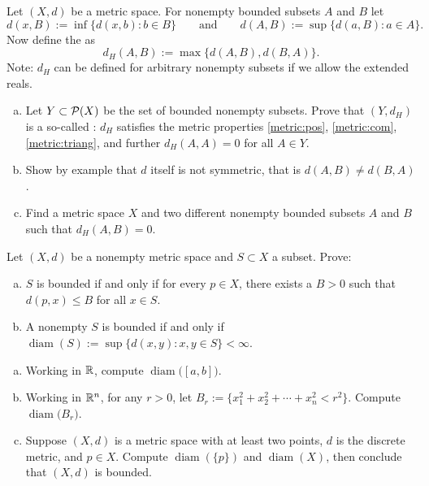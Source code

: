 \begin{exercise} \label{exercise:mshausdorffpseudo}
Let $(X,d)$ be a metric space.  For nonempty bounded subsets $A$ and $B$ let
\begin{equation*}
d(x,B) := \inf \bigl\{ d(x,b) : b \in B \bigl\}
\qquad \text{and} \qquad
d(A,B) := \sup \bigl\{ d(a,B) : a \in A \bigr\} .
\end{equation*}
Now define the \emph{} as
\begin{equation*}
d_H(A,B) := \max \bigl\{ d(A,B) , d(B,A) \bigr\} .
\end{equation*}
Note: $d_H$ can be defined for arbitrary nonempty subsets if we allow the
extended reals.
\begin{enumerate}[a)]
\item
Let $Y \subset {\mathcal{P}}(X)$ be the set of bounded nonempty subsets.
Prove that
$(Y,d_H)$ is a so-called \emph{}:
$d_H$ satisfies the metric properties
\ref{metric:pos},
\ref{metric:com}, 
\ref{metric:triang}, and further
$d_H(A,A) = 0$ for all $A \in Y$. 
\item
Show by example that $d$ itself is not symmetric, that is $d(A,B) \not=
d(B,A)$.
\item
Find a metric space $X$ and two different
nonempty bounded subsets $A$ and $B$ such that $d_H(A,B) = 0$.
\end{enumerate}
\end{exercise}

\begin{exercise}
Let $(X,d)$ be a nonempty metric space and $S \subset X$ a subset.  Prove:
\begin{enumerate}[a)]
\item
$S$ is bounded if and only if
for every $p \in X$, there exists a $B > 0$ such that $d(p,x) \leq B$ for
all $x \in S$.
\item
A nonempty $S$ is bounded if and only if
$\operatorname{diam}(S) := \sup \{ d(x,y) : x,y \in S \} < \infty$.
\end{enumerate}
\end{exercise}

\begin{samepage}
\begin{exercise}
\leavevmode
\begin{enumerate}[a)]
\item
Working in ${\mathbb{R}}$, compute $\operatorname{diam}\bigl([a,b]\bigr)$.
\item
Working in ${\mathbb{R}}^n$, for any $r > 0$, let $B_r := \{ x_1^2+x_2^2+\cdots+x_n^2
< r^2 \}$.  Compute $\operatorname{diam}\bigl(B_r\bigr)$.
\item
Suppose $(X,d)$ is a metric space with at least two points,
$d$ is the discrete metric, and $p \in X$.
Compute
$\operatorname{diam}(\{ p \})$ and $\operatorname{diam}(X)$,
then conclude that $(X,d)$ is bounded.
\end{enumerate}
\end{exercise}
\end{samepage}

